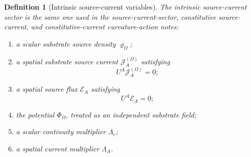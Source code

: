 \documentclass[11pt]{article}
\newcommand{\FlowPot}{\Phi_\Omega}
\newcommand{\SourceDensity}{\varrho_\Omega}
\newcommand{\SourceCurrent}{\mathcal J^{(\Omega)}}
\newcommand{\ContMult}{\Lambda_{\mathrm c}}
\newcommand{\CurrentMult}{\Lambda}
\newcommand{\SourceFlux}{\mathcal E}
\newtheorem{definition}{Definition}
\begin{document}
\begin{definition}[Intrinsic source-current variables]
\label{def:sourcevars}
The \emph{intrinsic source-current sector} is the same one used in the source-current-sector, constitutive source-current, and constitutive-current curvature-action notes:
\begin{enumerate}
    \item a scalar substrate source density \(\SourceDensity\);
    \item a spatial substrate source current \(\SourceCurrent_A\) satisfying
    \begin{equation}
    U^A\SourceCurrent_A=0;
    \label{eq:spatialcurrent}
    \end{equation}
    \item a spatial source flux \(\SourceFlux_A\) satisfying
    \begin{equation}
    U^A\SourceFlux_A=0;
    \label{eq:spatialflux}
    \end{equation}
    \item the potential \(\FlowPot\), treated as an independent substrate field;
    \item a scalar continuity multiplier \(\ContMult\);
    \item a spatial current multiplier \(\CurrentMult_A\).
\end{enumerate}
\end{definition}
\end{document}
